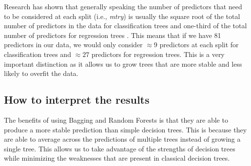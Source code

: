 Research has shown that generally speaking the number of predictors that need to be considered at each split (i.e., \textit{mtry}) is usually the square root of the total number of predictors in the data for classification trees and one-third of the total number of predictors for regression trees \citep{breimanRandomForests2001,sandriBiasCorrectionAlgorithm2008,hastieElementsStatisticalLearning2009,
janitzaOverestimationRandomForests2018,boehmkeHandsOnMachineLearning2019,jamesIntroductionStatisticalLearning2021}. This means that if we have 81 predictors in our data, we would only consider $\approx 9$ predictors at each split for classification trees and $\approx 27$ predictors for regression trees. This is a very important distinction as it allows us to grow trees that are more stable and less likely to overfit the data.

\subsection{How to interpret the results} \label{sec:random_forests_interpret}

The benefits of using Bagging and Random Forests is that they are able to produce a more stable prediction than simple decision trees. This is because they are able to average across the predictions of multiple trees instead of growing a single tree. This allows us to take advantage of the strengths of decision trees while minimizing the weaknesses that are present in classical decision trees. 

